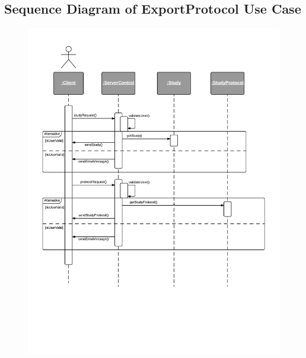 \subsection{Sequence Diagram of ExportProtocol Use Case}
\begin{figure}[H]
  \includegraphics[width=45em]{section/DynamicModel/Sequence_Diagram_Export_Protocol}
  \label{fig:Sequence Diagram of ExportProtocol Use Case}
\end{figure}
